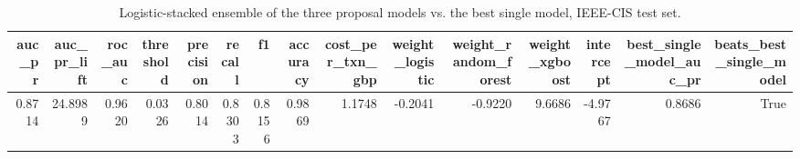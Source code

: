 \begin{table}
\caption{Logistic-stacked ensemble of the three proposal models vs. the best single model, IEEE-CIS test set.}
\label{tab:table16_stacked_ensemble}
\begin{tabular}{rrrrrrrrrrrrrrr}
\toprule
auc\_pr & auc\_pr\_lift & roc\_auc & threshold & precision & recall & f1 & accuracy & cost\_per\_txn\_gbp & weight\_logistic & weight\_random\_forest & weight\_xgboost & intercept & best\_single\_model\_auc\_pr & beats\_best\_single\_model \\
\midrule
0.8714 & 24.8989 & 0.9620 & 0.0326 & 0.8014 & 0.8303 & 0.8156 & 0.9869 & 1.1748 & -0.2041 & -0.9220 & 9.6686 & -4.9767 & 0.8686 & True \\
\bottomrule
\end{tabular}
\end{table}
